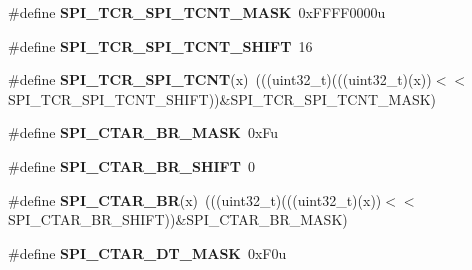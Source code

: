 \begin{DoxyCompactItemize}
\item 
\#define {\bfseries S\+P\+I\+\_\+\+T\+C\+R\+\_\+\+S\+P\+I\+\_\+\+T\+C\+N\+T\+\_\+\+M\+A\+SK}~0x\+F\+F\+F\+F0000u\hypertarget{group__SPI__Register__Masks_ga3b9bdb39b00af35d3f731123bc82d143}{}\label{group__SPI__Register__Masks_ga3b9bdb39b00af35d3f731123bc82d143}

\item 
\#define {\bfseries S\+P\+I\+\_\+\+T\+C\+R\+\_\+\+S\+P\+I\+\_\+\+T\+C\+N\+T\+\_\+\+S\+H\+I\+FT}~16\hypertarget{group__SPI__Register__Masks_ga4ac4f90bab2c1a761f439f50bcdca71f}{}\label{group__SPI__Register__Masks_ga4ac4f90bab2c1a761f439f50bcdca71f}

\item 
\#define {\bfseries S\+P\+I\+\_\+\+T\+C\+R\+\_\+\+S\+P\+I\+\_\+\+T\+C\+NT}(x)~(((uint32\+\_\+t)(((uint32\+\_\+t)(x))$<$$<$S\+P\+I\+\_\+\+T\+C\+R\+\_\+\+S\+P\+I\+\_\+\+T\+C\+N\+T\+\_\+\+S\+H\+I\+FT))\&S\+P\+I\+\_\+\+T\+C\+R\+\_\+\+S\+P\+I\+\_\+\+T\+C\+N\+T\+\_\+\+M\+A\+SK)\hypertarget{group__SPI__Register__Masks_ga3e79144ff705279f17e657cd3d596afa}{}\label{group__SPI__Register__Masks_ga3e79144ff705279f17e657cd3d596afa}

\item 
\#define {\bfseries S\+P\+I\+\_\+\+C\+T\+A\+R\+\_\+\+B\+R\+\_\+\+M\+A\+SK}~0x\+Fu\hypertarget{group__SPI__Register__Masks_gad1ba5817c825831950fc73cc726f0737}{}\label{group__SPI__Register__Masks_gad1ba5817c825831950fc73cc726f0737}

\item 
\#define {\bfseries S\+P\+I\+\_\+\+C\+T\+A\+R\+\_\+\+B\+R\+\_\+\+S\+H\+I\+FT}~0\hypertarget{group__SPI__Register__Masks_gad988143e0be530acb59dca0fad52ec0b}{}\label{group__SPI__Register__Masks_gad988143e0be530acb59dca0fad52ec0b}

\item 
\#define {\bfseries S\+P\+I\+\_\+\+C\+T\+A\+R\+\_\+\+BR}(x)~(((uint32\+\_\+t)(((uint32\+\_\+t)(x))$<$$<$S\+P\+I\+\_\+\+C\+T\+A\+R\+\_\+\+B\+R\+\_\+\+S\+H\+I\+FT))\&S\+P\+I\+\_\+\+C\+T\+A\+R\+\_\+\+B\+R\+\_\+\+M\+A\+SK)\hypertarget{group__SPI__Register__Masks_ga8ef1d047cb27c76c57b494ffeada5259}{}\label{group__SPI__Register__Masks_ga8ef1d047cb27c76c57b494ffeada5259}

\item 
\#define {\bfseries S\+P\+I\+\_\+\+C\+T\+A\+R\+\_\+\+D\+T\+\_\+\+M\+A\+SK}~0x\+F0u\hypertarget{group__SPI__Register__Masks_ga7d4ee19c78f67b68c6320eefe6a53ac0}{}\label{group__SPI__Register__Masks_ga7d4ee19c78f67b68c6320eefe6a53ac0}


\end{DoxyCompactItemize}
